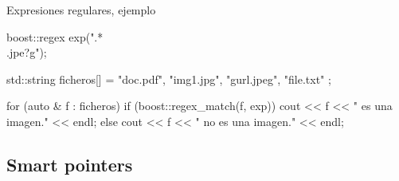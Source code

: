 \documentclass[8pt,xcolor=svgnames]{beamer}
\begin{document}
 

  


  

\begin{frame}[fragile]{Expresiones regulares, ejemplo}
  \begin{cppcode}
boost::regex exp(".*\\.jpe?g");

std::string ficheros[] = 
  { "doc.pdf", "img1.jpg", "gurl.jpeg", "file.txt" };
    
for (auto & f : ficheros) {
    if (boost::regex_match(f, exp)) {
        cout << f << " es una imagen." << endl;
    } else {
        cout << f << " no es una imagen." << endl;
    }
}    
  \end{cppcode}
\end{frame}

\subsection{Smart pointers}
\end{document}
